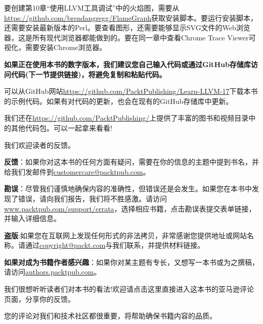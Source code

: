 要创建第10章“使用LLVM工具调试”中的火焰图，需要从\url{https://github.com/brendangregg/FlameGraph}获取安装脚本。要运行安装脚本，还需要安装最新版本的Perl。要查看图形，还需要能够显示SVG文件的Web浏览器，这是所有现代浏览器都能做到的。要在同一章中查看Chrome Trace Viewer可视化，需要安装Chrome浏览器。

\textbf{如果正在使用本书的数字版本，我们建议您自己输入代码或通过GitHub存储库访问代码(下一节提供链接)，将避免复制和粘贴代码。}


可以从GitHub网站\url{https://github.com/PacktPublishing/Learn-LLVM-17}下载本书的示例代码。如果有对代码的更新，也会在现有的GitHub存储库中更新。

我们还在\url{https://github.com/PacktPublishing/}上提供了丰富的图书和视频目录中的其他代码包。可以一起拿来看看!



我们欢迎读者的反馈。

\textbf{反馈}：如果你对这本书的任何方面有疑问，需要在你的信息的主题中提到书名，并给我们发邮件到\url{customercare@packtpub.com}。

\textbf{勘误}：尽管我们谨慎地确保内容的准确性，但错误还是会发生。如果您在本书中发现了错误，请向我们报告，我们将不胜感激。请访问\url{www.packtpub.com/support/errata}，选择相应书籍，点击勘误表提交表单链接，并输入详细信息。

\textbf{盗版}:如果您在互联网上发现任何形式的非法拷贝，非常感谢您提供地址或网站名称。请通过\url{copyright@packt.com}与我们联系，并提供材料链接。

\textbf{如果对成为书籍作者感兴趣}：如果你对某主题有专长，又想写一本书或为之撰稿，请访问\url{authors.packtpub.com}。



我们很想听听读者们对本书的看法!欢迎请点击这里直接进入这本书的亚马逊评论页面，分享你的反馈。

您的评论对我们和技术社区都很重要，将帮助确保书籍内容的品质。

